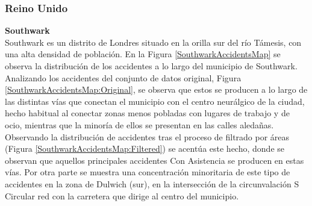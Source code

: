 \subsubsection*{Reino Unido}

\textbf{Southwark}\\

Southwark es un distrito de Londres situado en la orilla sur del río Támesis, con una alta densidad de población. En la Figura \ref{SouthwarkAccidentsMap} se observa la distribución de los accidentes a lo largo del municipio de Southwark. Analizando los accidentes del conjunto de datos original, Figura \ref{SouthwarkAccidentsMap:Original}, se observa que estos se producen a lo largo de las distintas vías que conectan el municipio con el centro neurálgico de la ciudad, hecho habitual al conectar zonas menos pobladas con lugares de trabajo y de ocio, mientras que la minoría de ellos se presentan en las calles aledañas. Observando la distribución de accidentes tras el proceso de filtrado por áreas (Figura \ref{SouthwarkAccidentsMap:Filtered}) se acentúa este hecho, donde se observan que aquellos principales accidentes Con Asistencia se producen en estas vías. Por otra parte se muestra una concentración minoritaria de este tipo de accidentes en la zona de Dulwich (sur), en la intersección de la circunvalación S Circular red con la carretera que dirige al centro del municipio.


